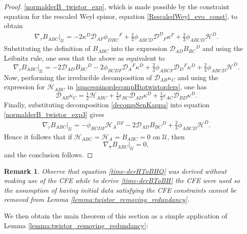 \documentclass[10pt,a4paper]{article}
\theoremstyle{plain}
\newtheorem{remark}{Remark}
\begin{document}
\begin{proof}
\eqref{normalderB_twistor_exp}, which is made possible by the
constraint equation for the rescaled Weyl spinor, equation
\eqref{RescaledWeyl_evo_const}, to obtain
\begin{align}\label{normalderB_twistor_exp2}
\nabla_{\tau}B_{ABC}|_{\mathcal{U}}= -2 \kappa ^{D} \mathcal{D}
_{AF}\phi _{DBC}{}^{F} + \tfrac{2}{3} \phi _{ABCD} \mathcal{D}
^{D}{}_{F}\kappa ^{F} + \tfrac{2}{3}\phi_{ABCD}\mathcal{H}^D.
\end{align}
Substituting the definition of $B_{ABC}$ into the expression
$\mathcal{D} _{AD}B_{BC}{}^{D}$ and using the Leibnitz rule, one sees
that the above as equivalent to
\begin{equation}\label{normalderB_twistor_exp3}
\nabla_{\tau}B_{ABC}|_{\mathcal{U}}= -2 \mathcal{D} _{AD}B_{BC}{}^{D}
-2 \phi _{BCDF} \mathcal{D} _{A}{}^{F}\kappa ^{D} +\tfrac{2}{3} \phi
_{ABCF} \mathcal{D} _{D}{}^{F}\kappa ^{D} +
\tfrac{2}{3}\phi_{ABCD}\mathcal{H}^D.
\end{equation}
Now, performing the irreducible decomposition of $\mathcal{D}
_{AB}\kappa _{C}$ and using the expression for $\mathcal{H}_{ABC}$ in
\eqref{spacespinordecompHtotwistorders}, one has
\begin{equation}\label{decompSenKappa}
\mathcal{D} _{AB}\kappa _{C} = \tfrac{1}{2} \mathcal{H} _{ABC} +
\tfrac{1}{3} \epsilon _{BC} \mathcal{D} _{AD}\kappa ^{D} +
\tfrac{1}{3} \epsilon _{AC} \mathcal{D} _{BD}\kappa ^{D}.
\end{equation}
Finally, substituting decomposition \eqref{decompSenKappa} into
equation \eqref{normalderB_twistor_exp3} gives
\begin{align}\label{time-derBToBH}
\nabla_{\tau}B_{ABC}|_{\mathcal{U}}=- \phi _{BCDF} \mathcal{H}
_{A}{}^{DF} -2 \mathcal{D} _{AD}B_{BC}{}^{D} +
\tfrac{2}{3}\phi_{ABCD}\mathcal{H}^D.
\end{align}
Hence it follows that if $\mathcal{H}_{ABC}=\mathcal{H}_A=B_{ABC}=0$
on $\mathcal{U}$, then
\[\nabla_{\bm\tau}B_{ABC}|_{\mathcal{U}}=0, \]
and the conclusion follows.
\end{proof} 
\begin{remark}\emph{
Observe that equation \eqref{time-derHToBHQ} was derived without
making use of the CFE while to derive \eqref{time-derBToBH} the CFE
were used so the assumption of having initial data satisfying the CFE
constraints cannot be removed from Lemma
\ref{lemma:twistor_removing_redundancy}.  }
\end{remark}

We then obtain the main theorem of this section as a simple
application of Lemma \ref{lemma:twistor_removing_redundancy}:
\end{document}
